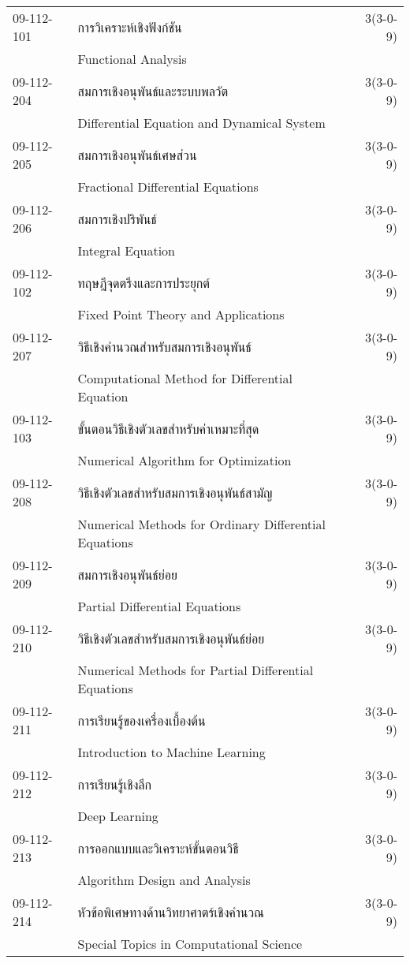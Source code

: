 \begin{longtable}{p{}p{}r{}}
09-112-101 & การวิเคราะห์เชิงฟังก์ชัน & 3(3-0-9)\\
 & Functional Analysis & \\[3mm]
09-112-204 & สมการเชิงอนุพันธ์และระบบพลวัต & 3(3-0-9)\\
 & Differential Equation and Dynamical System & \\[3mm]
09-112-205 & สมการเชิงอนุพันธ์เศษส่วน & 3(3-0-9)\\
 & Fractional Differential Equations & \\[3mm]
09-112-206 & สมการเชิงปริพันธ์ & 3(3-0-9)\\
 & Integral Equation & \\[3mm]
09-112-102 & ทฤษฎีจุดตรึงและการประยุกต์ & 3(3-0-9)\\
 & Fixed Point Theory and Applications & \\[3mm]
09-112-207 & วิธีเชิงคำนวณสำหรับสมการเชิงอนุพันธ์ & 3(3-0-9)\\
 & Computational Method for Differential Equation & \\[3mm]
09-112-103 & ขั้นตอนวิธีเชิงตัวเลขสำหรับค่าเหมาะที่สุด & 3(3-0-9)\\
 & Numerical Algorithm for Optimization & \\[3mm]
09-112-208 & วิธีเชิงตัวเลขสำหรับสมการเชิงอนุพันธ์สามัญ & 3(3-0-9)\\
 & Numerical Methods for Ordinary Differential Equations & \\[3mm]
09-112-209 & สมการเชิงอนุพันธ์ย่อย & 3(3-0-9)\\
 & Partial Differential Equations & \\[3mm]
09-112-210 & วิธีเชิงตัวเลขสำหรับสมการเชิงอนุพันธ์ย่อย & 3(3-0-9)\\
 & Numerical Methods for Partial Differential Equations & \\[3mm]
09-112-211 & การเรียนรู้ของเครื่องเบื้องต้น & 3(3-0-9)\\
 & Introduction to Machine Learning & \\[3mm]
09-112-212 & การเรียนรู้เชิงลึก & 3(3-0-9)\\
 & Deep Learning & \\[3mm]
09-112-213 & การออกแบบและวิเคราะห์ขั้นตอนวิธี & 3(3-0-9)\\
 & Algorithm Design and Analysis & \\[3mm]
09-112-214 & หัวข้อพิเศษทางด้านวิทยาศาตร์เชิงคำนวณ & 3(3-0-9)\\
 & Special Topics in Computational Science & \\[3mm]
\end{longtable}
